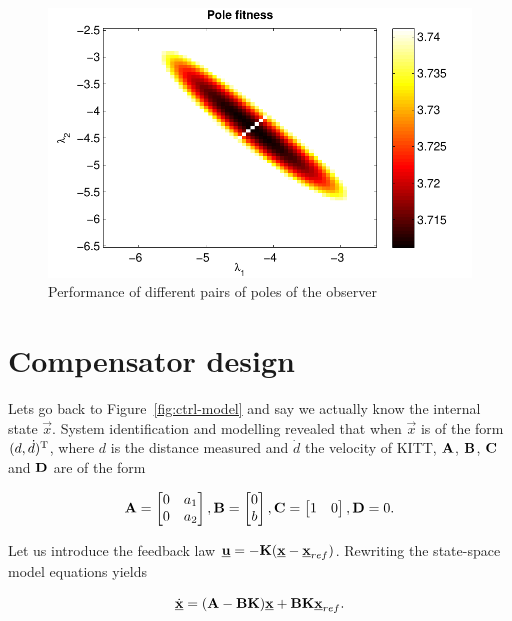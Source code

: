 \documentclass[11pt,titlepage]{report}
\begin{document}
\begin{figure}[H]
	\begin{center}
		\includegraphics[width=.7\linewidth]{resource/pole-fitness.pdf}
	\end{center}
	\caption{Performance of different pairs of poles of the observer}
	\label{fig:ctrl-poles}
\end{figure}

\section{Compensator design}
Lets go back to Figure~\ref{fig:ctrl-model} and say we actually know the internal state $\vec{x}$. System identification and modelling revealed that when $\vec{x}$ is of the form $(d,\dot{d})^{\text T}$, where $d$ is the distance measured and $\dot{d}$ the velocity of KITT, $\mathbf{A}$, $\mathbf{B}$, $\mathbf{C}$ and $\mathbf{D}$ are of the form

\begin{equation}
	\mathbf{A} = \begin{bmatrix}
		0 & a_1 \\
		0 & a_2
	\end{bmatrix}, \mathbf{B} = \begin{bmatrix}
		0 \\
		b
	\end{bmatrix}, \mathbf{C} = \begin{bmatrix}
		1 & 0
	\end{bmatrix}, \mathbf{D} = 0.
\end{equation}

Let us introduce the feedback law $\mathbf{\underline{u}} = -\mathbf{K}(\mathbf{\underline{x}}-\mathbf{\underline{x}}_{ref})$. Rewriting the state-space model equations yields

\begin{equation} \label{eq:ctrl-comp}
	\dot{\mathbf{\underline{x}}} = (\mathbf{A} - \mathbf{B} \mathbf{K}) \mathbf{\underline{x}} + \mathbf{B} \mathbf{K} \mathbf{\underline{x}}_{ref}.
\end{equation}
\end{document}
